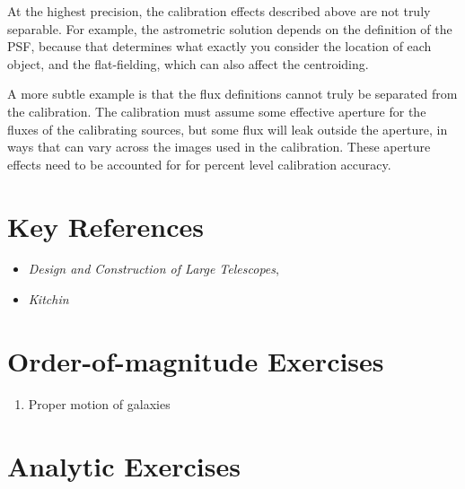 At the highest precision, the calibration effects described above are
not truly separable. For example, the astrometric solution depends on
the definition of the PSF, because that determines what exactly you
consider the location of each object, and the flat-fielding, which can
also affect the centroiding.

A more subtle example is that the flux definitions cannot truly be
separated from the calibration. The calibration must assume some
effective aperture for the fluxes of the calibrating sources, but some
flux will leak outside the aperture, in ways that can vary across the
images used in the calibration. These aperture effects need to be
accounted for for percent level calibration accuracy.

\section{Key References}

\begin{itemize}
  \item
    {\it Design and Construction of Large Telescopes},
      \citet{bely}
  \item
    {\it Kitchin}
\end{itemize}

\citet{gunn06a}

\section{Order-of-magnitude Exercises}

\begin{enumerate} 
\item Proper motion of galaxies 
\end{enumerate} 

\section{Analytic Exercises}

